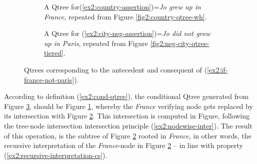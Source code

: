 \begin{figure}[H]
	\centering
	\begin{subfigure}[t]{.45\linewidth}
		\centering
	\caption{A Qtree for(\ref{ex2:country-assertion})=\textit{Jo grew up in France}, repeated from Figure \ref{fig2:country-qtree-wh}.}\label{fig2:country-qtree-wh2}
	\end{subfigure}
	\hfill
	\begin{subfigure}[t]{.45\linewidth}
		\centering
	\caption{A Qtree for (\ref{ex2:city-neg-assertion})=\textit{Jo did not grow up in Paris}, repeated from Figure \ref{fig2:neg-city-qtree-tiered}.}\label{fig2:neg-city-qtree-tiered2}
	\end{subfigure}
	\caption{Qtrees corresponding to the antecedent and consequent of (\ref{ex2:if-france-not-paris}).}\label{fig2:qtrees-if-france-not-paris}
\end{figure}

According to definition (\ref{ex2:cond-qtree}), the conditional Qtree generated from Figure \ref{fig2:qtrees-if-france-not-paris}, should be Figure \ref{fig2:country-qtree-wh2}, whereby the \textit{France} verifying node gets replaced by its intersection with Figure  \ref{fig2:neg-city-qtree-tiered2}. This intersection is computed in Figure, following the tree-node intersection intersection principle (\ref{ex2:nodewise-inter}). The result of this operation, is the subtree of Figure \ref{fig2:neg-city-qtree-tiered2} rooted in \textit{France}, in other words, the recursive interpretation of the \textit{France}-node in Figure \ref{fig2:neg-city-qtree-tiered2} -- in line with property (\ref{ex2:recursive-interpretation-cs}).

